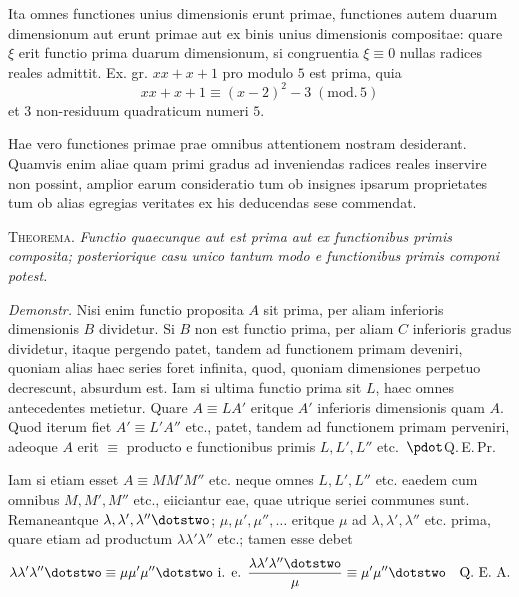 Ita omnes functiones unius dimensionis erunt primae, functiones autem duarum dimensionum aut erunt primae aut ex binis unius dimensionis compositae: quare $\xi$ erit functio prima duarum dimensionum, si congruentia $\xi\equiv0$ nullas radices reales admittit. Ex. gr. $xx+x+1$ pro modulo $5$ est prima, quia
\[
xx+x+1\equiv(x-2)^2-3\;(\mathrm{mod.}\,5)
\]
et $3$ non-residuum quadraticum numeri $5$.

Hae vero functiones primae prae omnibus attentionem nostram desiderant. Quamvis enim aliae quam primi gradus ad inveniendas radices reales inservire non possint, amplior earum consideratio tum ob insignes ipsarum proprietates tum ob alias egregias veritates ex his deducendas sese commendat.

\textsc{Theorema.} \emph{Functio quaecunque aut est prima aut ex functionibus primis composita; posteriorique casu unico tantum modo e functionibus primis componi potest.}

\emph{Demonstr.} Nisi enim functio proposita $A$ sit prima, per aliam inferioris dimensionis $B$ dividetur. Si $B$ non est functio prima, per aliam $C$ inferioris gradus dividetur, itaque pergendo patet, tandem ad functionem primam deveniri, quoniam alias haec series foret infinita, quod, quoniam dimensiones perpetuo decrescunt, absurdum est. Iam si ultima functio prima sit $L$, haec omnes antecedentes metietur. Quare $A\equiv LA'$ eritque $A'$ inferioris dimensionis quam $A$. Quod iterum fiet $A'\equiv L'A''$ etc., patet, tandem ad functionem primam perveniri, adeoque $A$ erit $\equiv$ producto e functionibus primis $L,L',L''$ etc.\ $\pdot$Q.\,E.\,Pr.

Iam si etiam esset $A\equiv MM'M''$ etc. neque omnes $L,L',L''$ etc. eaedem cum omnibus $M,M',M''$ etc., eiiciantur eae, quae utrique seriei communes
sunt. Remaneantque $\lambda,\lambda',\lambda''\dotstwo$; $\mu,\mu',\mu'',\ldots$ eritque $\mu$ ad $\lambda,\lambda',\lambda''$ etc. prima, quare etiam ad productum $\lambda\lambda'\lambda''$ etc.; tamen esse debet
\[
\lambda\lambda'\lambda''\dotstwo\equiv\mu\mu'\mu''\dotstwo\text{ i. e. }\frac{\lambda\lambda'\lambda''\dotstwo}{\mu}\equiv\mu'\mu''\dotstwo\quad\text{Q. E. A.}
\]
